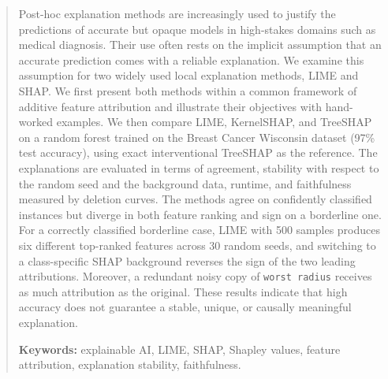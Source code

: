 \begin{abstract}
Post-hoc explanation methods are increasingly used to justify the predictions of accurate but opaque models in high-stakes domains such as medical diagnosis. Their use often rests on the implicit assumption that an accurate prediction comes with a reliable explanation. We examine this assumption for two widely used local explanation methods, LIME and SHAP. We first present both methods within a common framework of additive feature attribution and illustrate their objectives with hand-worked examples. We then compare LIME, KernelSHAP, and TreeSHAP on a random forest trained on the Breast Cancer Wisconsin dataset (97\% test accuracy), using exact interventional TreeSHAP as the reference. The explanations are evaluated in terms of agreement, stability with respect to the random seed and the background data, runtime, and faithfulness measured by deletion curves. The methods agree on confidently classified instances but diverge in both feature ranking and sign on a borderline one. For a correctly classified borderline case, LIME with 500 samples produces six different top-ranked features across 30 random seeds, and switching to a class-specific SHAP background reverses the sign of the two leading attributions. Moreover, a redundant noisy copy of \texttt{worst radius} receives as much attribution as the original. These results indicate that high accuracy does not guarantee a stable, unique, or causally meaningful explanation.

\vspace{0.8em}
\noindent\textbf{Keywords:} explainable AI, LIME, SHAP, Shapley values, feature attribution, explanation stability, faithfulness.

\vspace{0.5em}
\end{abstract}
